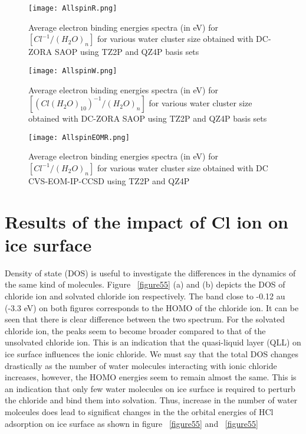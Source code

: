 \documentclass[a4paper,11pt]{report}
\begin{document}
\begin{figure}[H]\large
\captionsetup{font=footnotesize}
\texttt{[image: AllspinR.png]}
\caption{Average electron binding energies spectra (in eV) for $[Cl^{-1}/(H_{2}O)_{n}]$ for various water cluster size obtained with DC-ZORA SAOP using TZ2P and QZ4P basis sets}
\label{figure50}
\end{figure}

\begin{figure}[H]\large
\captionsetup{font=footnotesize}
\texttt{[image: AllspinW.png]}
\caption{Average electron binding energies spectra (in eV) for $[(Cl(H_{2}O)_{10})^{-1}/(H_{2}O)_{n}]$ for various water cluster size obtained with DC-ZORA SAOP using TZ2P and QZ4P basis sets}
\label{figure51}
\end{figure}

\begin{figure}[H]\large
\captionsetup{font=footnotesize}
\texttt{[image: AllspinEOMR.png]}
\caption{Average electron binding energies spectra (in eV) for $[Cl^{-1}/(H_{2}O)_{n}]$ for various water cluster size obtained with DC CVS-EOM-IP-CCSD using TZ2P and QZ4P}
\label{figure52}
\end{figure}





\section{Results of the impact of Cl ion on ice surface}
Density of state (DOS) is useful to investigate the differences in the dynamics of the same kind of molecules. Figure ~\ref{figure55} (a) and (b) depicts the DOS of chloride ion and solvated chloride ion respectively. The band close to -0.12 au (-3.3 eV) on both figures corresponds to the HOMO of the chloride ion. It can be seen that there is clear difference between the two spectrum. For the solvated chloride ion, the peaks seem to become broader compared to that of the unsolvated chloride ion. This is an indication that the quasi-liquid layer (QLL) on ice surface influences the ionic chloride. We must say that the total DOS changes drastically as the number of water molecules interacting with ionic chloride increases, however, the HOMO energies seem to remain almost the same. This is an indication that only few water molecules on ice surface is required to perturb the chloride and bind them into solvation. Thus, increase in the number of water molceules does lead to significat changes in the the orbital energies of HCl adsorption on ice surface as shown in figure ~\ref{figure55} and ~\ref{figure55}
\end{document}
